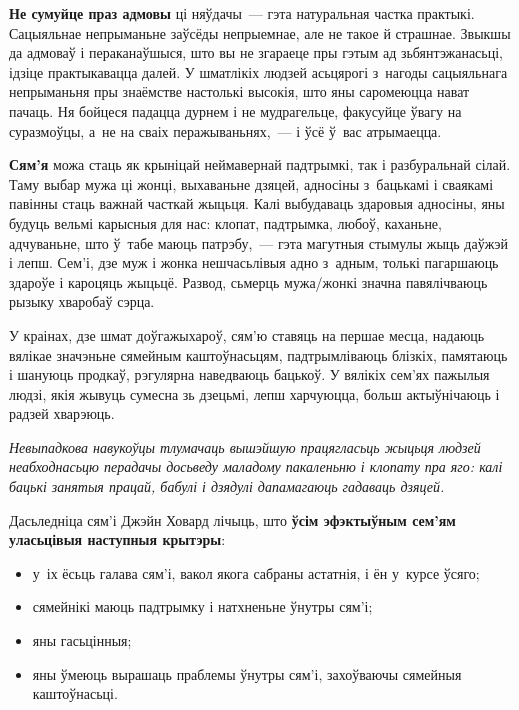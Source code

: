 \textbf{Не сумуйце праз адмовы} ці няўдачы~--- гэта натуральная частка практыкі. Сацыяльнае непрыманьне заўсёды непрыемнае, але не такое й страшнае. Звыкшы да адмоваў і пераканаўшыся, што вы не згараеце пры гэтым ад зьбянтэжанасьці, ідзіце практыкавацца далей. У шматлікіх людзей асьцярогі з~нагоды сацыяльнага непрыманьня пры знаёмстве настолькі высокія, што яны саромеюцца нават пачаць. Ня бойцеся падацца дурнем і не мудрагельце, факусуйце ўвагу на суразмоўцы, а~не на сваіх перажываньнях,~--- і ўсё ў~вас атрымаецца.

\textbf{Сям'я} можа стаць як крыніцай неймавернай падтрымкі, так і разбуральнай сілай. Таму выбар мужа ці жонці, выхаваньне дзяцей, адносіны з~бацькамі і сваякамі павінны стаць важнай часткай жыцьця. Калі выбудаваць здаровыя адносіны, яны будуць вельмі карысныя для нас: клопат, падтрымка, любоў, каханьне, адчуваньне, што ў~табе маюць патрэбу,~--- гэта магутныя стымулы жыць даўжэй і лепш. Сем'і, дзе муж і жонка нешчасьлівыя адно з~адным, толькі пагаршаюць здароўе і кароцяць жыцьцё. Развод, сьмерць мужа/жонкі значна павялічваюць рызыку хваробаў сэрца. 


У краінах, дзе шмат доўгажыхароў, сям'ю ставяць на першае месца, надаюць вялікае значэньне сямейным каштоўнасьцям, падтрымліваюць блізкіх, памятаюць і шануюць продкаў, рэгулярна наведваюць бацькоў. У вялікіх сем'ях пажылыя людзі, якія жывуць сумесна зь дзецьмі, лепш харчуюцца, больш актыўнічаюць і радзей хварэюць.

\emph{Невыпадкова навукоўцы тлумачаць вышэйшую працягласьць жыцьця людзей неабходнасьцю перадачы досьведу маладому пакаленьню і клопату пра яго: калі бацькі занятыя працай, бабулі і дзядулі дапамагаюць гадаваць дзяцей.}

Дасьледніца сям'і Джэйн Ховард лічыць, што \textbf{ўсім эфэктыўным сем'ям уласьцівыя наступныя крытэры}: 
\begin{itemize}
  \item у~іх ёсьць галава сям'і, вакол якога сабраны астатнія, і ён у~курсе ўсяго;
  \item сямейнікі маюць падтрымку і натхненьне ўнутры сям'і;
  \item яны гасьцінныя;
  \item яны ўмеюць вырашаць праблемы ўнутры сям'і, захоўваючы сямейныя каштоўнасьці.
\end{itemize}


